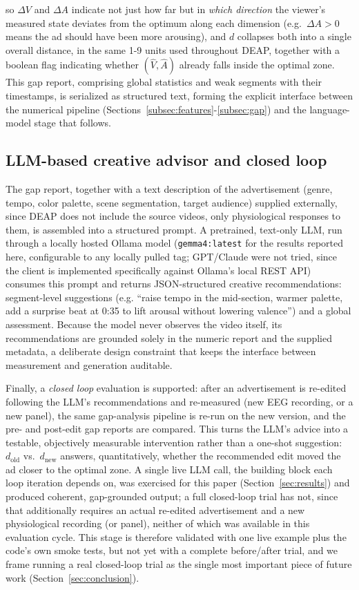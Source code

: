 \documentclass[conference]{IEEEtran}
\begin{document}
\noindent so $\Delta V$ and $\Delta A$ indicate not just how far but in
\emph{which direction} the viewer's measured state deviates from the
optimum along each dimension (e.g.\ $\Delta A > 0$ means the ad should
have been more arousing), and $d$ collapses both into a single overall
distance, in the same 1-9 units used throughout DEAP, together with a
boolean flag indicating whether $(\hat V, \hat A)$ already falls inside
the optimal zone. This gap report, comprising
global statistics and weak segments with their timestamps, is serialized as
structured text, forming the explicit interface between the numerical
pipeline (Sections~\ref{subsec:features}-\ref{subsec:gap}) and the
language-model stage that follows.

\subsection{LLM-based creative advisor and closed loop}
\label{subsec:advisor}

The gap report, together with a text description of the advertisement
(genre, tempo, color palette, scene segmentation, target audience) supplied
externally, since DEAP does not include the source videos, only
physiological responses to them, is assembled into a structured prompt.
A pretrained, text-only LLM, run through a locally hosted Ollama model
(\texttt{gemma4:latest} for the results reported here, configurable to
any locally pulled tag; GPT/Claude were not tried, since the client is
implemented specifically against Ollama's local REST API) consumes this
prompt and returns
JSON-structured creative recommendations: segment-level suggestions (e.g.
``raise tempo in the mid-section, warmer palette, add a surprise beat at
0:35 to lift arousal without lowering valence'') and a global assessment.
Because the model never observes the video itself, its recommendations are
grounded solely in the numeric report and the supplied metadata,
a deliberate design constraint that keeps the interface between
measurement and generation auditable.

Finally, a \emph{closed loop} evaluation is supported: after an
advertisement is re-edited following the LLM's recommendations and
re-measured (new EEG recording, or a new panel), the same gap-analysis
pipeline is re-run on the new version, and the pre- and post-edit gap
reports are compared. This turns the LLM's advice into a testable,
objectively measurable intervention rather than a one-shot suggestion:
$d_{\text{old}}$ vs.\ $d_{\text{new}}$ answers, quantitatively, whether the
recommended edit moved the ad closer to the optimal zone. A single live
LLM call, the building block each loop iteration depends on, was
exercised for this paper (Section~\ref{sec:results}) and produced
coherent, gap-grounded output; a full closed-loop trial has not, since
that additionally requires an actual re-edited advertisement and a new
physiological recording (or panel), neither of which was available in
this evaluation cycle. This stage is therefore validated with one live
example plus the code's own smoke tests, but not yet with a complete
before/after trial, and we frame running a real closed-loop trial as the
single most important piece of future
work (Section~\ref{sec:conclusion}).
\end{document}
